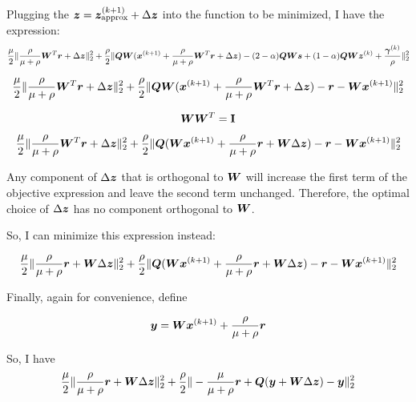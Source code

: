 \documentclass{article}
\begin{document}
Plugging the $\bm{z} = \bm{z}_{\text{approx}}^{(k + 1)} + \Delta\bm{z}$ into the function to be minimized, I have the expression:
\begin{equation}
\frac{\mu}{2} \|\frac{\rho}{\mu + \rho}\bm{W}^T\bm{r} + \Delta\bm{z}\|_2^2 + \frac{\rho}{2}\|\bm{Q}\bm{W}(\bm{x}^{(k + 1)} + \frac{\rho}{\mu + \rho}\bm{W}^T\bm{r} + \Delta\bm{z}) - (2 - \alpha)\bm{Q}\bm{W}\bm{s} + (1 - \alpha)\bm{Q}\bm{W}\bm{z}^{(k)} + \frac{\bm{\gamma}^{(k)}}{\rho}\|_2^2
\end{equation}


\begin{equation}
\frac{\mu}{2} \|\frac{\rho}{\mu + \rho}\bm{W}^T\bm{r} + \Delta\bm{z}\|_2^2 + \frac{\rho}{2}\|\bm{Q}\bm{W}(\bm{x}^{(k + 1)} + \frac{\rho}{\mu + \rho}\bm{W}^T\bm{r} + \Delta\bm{z}) - \bm{r} - \bm{W}\bm{x}^{(k + 1)}\|_2^2
\end{equation}

\begin{equation}
\bm{W}\bm{W}^T = {\bf I}
\end{equation}

\begin{equation}
\frac{\mu}{2} \|\frac{\rho}{\mu + \rho}\bm{W}^T\bm{r} + \Delta\bm{z}\|_2^2 + \frac{\rho}{2}\|\bm{Q}(\bm{W}\bm{x}^{(k + 1)} + \frac{\rho}{\mu + \rho}\bm{r} + \bm{W}\Delta\bm{z}) - \bm{r} - \bm{W}\bm{x}^{(k + 1)}\|_2^2
\end{equation}

Any component of $\Delta\bm{z}$ that is orthogonal to $\bm{W}$ will increase the first term of the objective expression and leave the second term unchanged. Therefore, the optimal choice of $\Delta\bm{z}$ has no component orthogonal to $\bm{W}$.

So, I can minimize this expression instead:

\begin{equation}
\frac{\mu}{2} \|\frac{\rho}{\mu + \rho}\bm{r} + \bm{W}\Delta\bm{z}\|_2^2 + \frac{\rho}{2}\|\bm{Q}(\bm{W}\bm{x}^{(k + 1)} + \frac{\rho}{\mu + \rho}\bm{r} + \bm{W}\Delta\bm{z}) - \bm{r} - \bm{W}\bm{x}^{(k + 1)}\|_2^2
\end{equation}

Finally, again for convenience, define

\begin{equation}
\bm{y} = \bm{W}\bm{x}^{(k + 1)} + \frac{\rho}{\mu + \rho}\bm{r}
\end{equation}

So, I have
\begin{equation}
\frac{\mu}{2} \|\frac{\rho}{\mu + \rho}\bm{r} + \bm{W}\Delta\bm{z}\|_2^2 + \frac{\rho}{2}\|-\frac{\mu}{\mu + \rho}\bm{r} + \bm{Q}(\bm{y} + \bm{W}\Delta\bm{z}) - \bm{y}\|_2^2
\end{equation}
\end{document}

